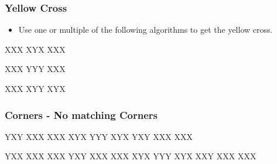\documentclass[9pt,dvipsnames]{extarticle}
\begin{document}
\begin{multicols*}{4}
\subsubsection*{Yellow Cross}

\begin{itemize}
   \item Use one or multiple of the following algorithms to get the yellow cross.
\end{itemize}

\RubikCubeGreyAll
\noindent
\RubikFaceUp
{X}{X}{X}
{X}{Y}{X}
{X}{X}{X}%

\RubikCubeGreyAll
\noindent
\RubikFaceUp
{X}{X}{X}
{Y}{Y}{Y}
{X}{X}{X}%

\RubikCubeGreyAll
\noindent
\RubikFaceUp
{X}{X}{X}
{X}{Y}{Y}
{X}{Y}{X}%

%

\subsubsection*{Corners - No matching Corners}

\RubikFaceBack%
{Y}{X}{Y}
{X}{X}{X}
{X}{X}{X}%
\RubikFaceUp%
{X}{Y}{X}
{Y}{Y}{Y}
{X}{Y}{X}%
\RubikFaceFront%
{Y}{X}{Y}
{X}{X}{X}
{X}{X}{X}
\hspace{.2pt}

\RubikCubeGreyAll%
\RubikFaceBack%
{Y}{X}{X}
{X}{X}{X}
{X}{X}{X}%
\RubikFaceLeft%
{Y}{X}{Y}
{X}{X}{X}
{X}{X}{X}%
\RubikFaceUp%
{X}{Y}{X}
{Y}{Y}{Y}
{X}{Y}{X}%
\RubikFaceFront%
{X}{X}{Y}
{X}{X}{X}
{X}{X}{X}


\end{multicols*}
\end{document}
